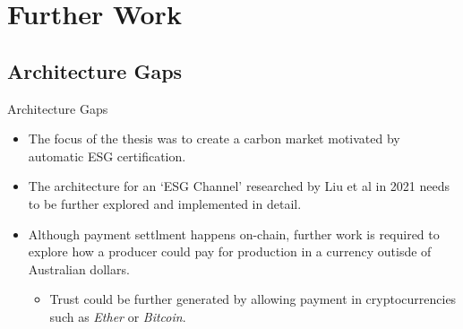 \section{Further Work}
\subsection{Architecture Gaps}
\begin{frame}{Architecture Gaps}
    \begin{itemize}
        \item The focus of the thesis was to create a carbon market
              motivated by automatic ESG certification.
        \item The architecture for an `ESG Channel' researched by Liu et al
              in 2021 needs to be further explored and implemented in detail.
        \item Although payment settlment happens on-chain, further work is
              required to explore how a producer could pay for production in
              a currency outisde of Australian dollars.
              \begin{itemize}
                  \item Trust could be further generated by allowing payment
                        in cryptocurrencies such as \textit{Ether} or \textit{Bitcoin}.
              \end{itemize}
    \end{itemize}
\end{frame}
